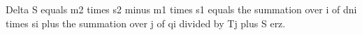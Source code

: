 Delta S equals m2 times s2 minus m1 times s1 equals the summation over i of dni times si plus the summation over j of qi divided by Tj plus S erz.